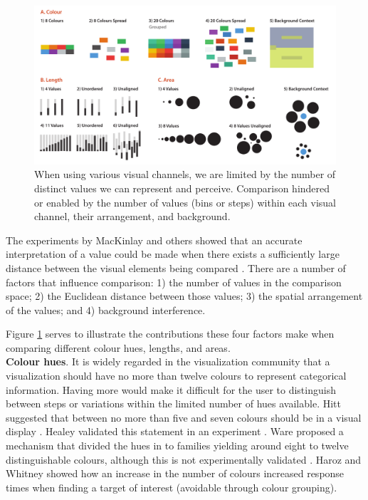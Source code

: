 \begin{figure}[h!]
\centering
\includegraphics[width=\textwidth]{images/related-work/context-comparison}
\caption{When using various visual channels, we are limited by the number of distinct values we can represent and perceive. Comparison hindered or enabled by the number of values (bins or steps) within each visual channel, their arrangement, and background.}
\label{fig:value-comparison}
\end{figure}

The experiments by MacKinlay and others showed that an accurate interpretation of a value could be made when there exists a sufficiently large distance between the visual elements being compared \cite{mackinlay1986automating, cleveland1984graphical, heer2010crowdsourcing}. 
There are a number of factors that influence comparison:
1) the number of values in the comparison space;
2) the Euclidean distance between those values;
3) the spatial arrangement of the values; and
4) background interference.

Figure \ref{fig:value-comparison} serves to illustrate the contributions these four factors make when comparing different colour hues, lengths, and areas. \\

\noindent\textbf{Colour hues}. It is widely regarded in the visualization community that a visualization should have no more than twelve colours to represent categorical information. 
Having more would make it difficult for the user to distinguish between steps or variations within the limited number of hues available.
Hitt suggested that between no more than five and seven colours should be in a visual display \cite{hitt1992retrofit}. 
Healey validated this statement in an experiment \cite{healey1996choosing}.
Ware proposed a mechanism that divided the hues in to families yielding around eight to twelve distinguishable colours, although this is not experimentally validated \cite{ware13}.
Haroz and Whitney showed how an increase in the number of colours increased response times when finding a target of interest (avoidable through colour grouping\cite{haroz2012capacity}).  

